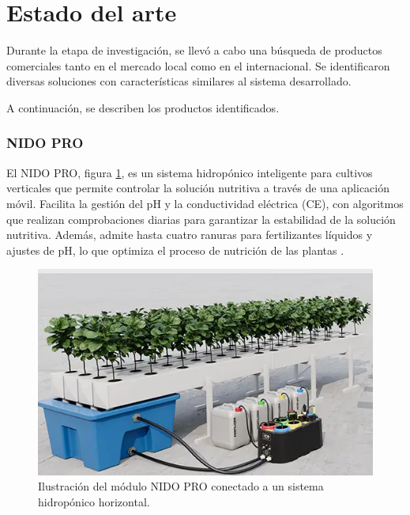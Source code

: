 \section{Estado del arte}
Durante la etapa de investigación, se llevó a cabo una búsqueda de productos comerciales tanto en el mercado local como en el internacional. Se identificaron diversas soluciones con características similares al sistema desarrollado.

A continuación, se describen los productos identificados.

\subsubsection{NIDO PRO}
El NIDO PRO, figura \ref{fig:nido_pro}, es un sistema hidropónico inteligente para cultivos verticales que permite controlar la solución nutritiva a través de una aplicación móvil. Facilita la gestión del pH y la conductividad eléctrica (CE), con algoritmos que realizan comprobaciones diarias para garantizar la estabilidad de la solución nutritiva. Además, admite hasta cuatro ranuras para fertilizantes líquidos y ajustes de pH, lo que optimiza el proceso de nutrición de las plantas \cite{NIDO:PRO}.

\begin{figure}[h]
	\centering
	\includegraphics[scale=.5]{./Figures/nido:pro.png}
	\caption{Ilustración del módulo NIDO PRO conectado a un sistema hidropónico horizontal\protect\footnotemark.}
	\label{fig:nido_pro}
\end{figure}




